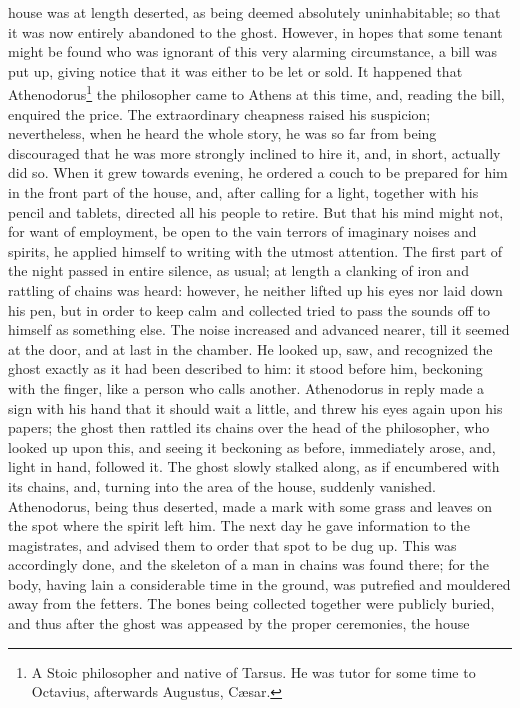 house was at length deserted, as being deemed absolutely uninhabitable; so
that it was now entirely abandoned to the ghost. However, in hopes that
some tenant might be found who was ignorant of this very alarming
circumstance, a bill was put up, giving notice that it was either to be
let or sold. It happened that Athenodorus\footnote{A Stoic philosopher and
native of Tarsus. He was tutor for some time to Octavius, afterwards
Augustus, Cæsar.} the philosopher came
to Athens at this time, and, reading the bill, enquired the price. The
extraordinary cheapness raised his suspicion; nevertheless, when he heard
the whole story, he was so far from being discouraged that he was more
strongly inclined to hire it, and, in short, actually did so. When it grew
towards evening, he ordered a couch to be prepared for him in the front
part of the house, and, after calling for a light, together with his
pencil and tablets, directed all his people to retire. But that his mind
might not, for want of employment, be open to the vain terrors of
imaginary noises and spirits, he applied himself to writing with the
utmost attention. The first part of the night passed in entire silence, as
usual; at length a clanking of iron and rattling of chains was heard:
however, he neither lifted up his eyes nor laid down his pen, but in order
to keep calm and collected tried to pass the sounds off to himself as
something else. The noise increased and advanced nearer, till it seemed at
the door, and at last in the chamber. He looked up, saw, and recognized
the ghost exactly as it had been described to him: it stood before him,
beckoning with the finger, like a person who calls another. Athenodorus in
reply made a sign with his hand that it should wait a little, and threw
his eyes again upon his papers; the ghost then rattled its chains over the
head of the philosopher, who looked up upon this, and seeing it beckoning
as before, immediately arose, and, light in hand, followed it. The ghost
slowly stalked along, as if encumbered with its chains, and, turning into
the area of the house, suddenly vanished. Athenodorus, being thus
deserted, made a mark with some grass and leaves on the spot where the
spirit left him. The next day he gave information to the magistrates, and
advised them to order that spot to be dug up. This was accordingly done,
and the skeleton of a man in chains was found there; for the body, having
lain a considerable time in the ground, was putrefied and mouldered away
from the fetters. The bones being collected together were publicly buried,
and thus after the ghost was appeased by the proper ceremonies, the house
